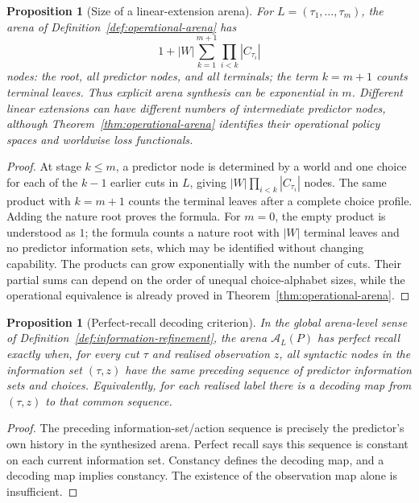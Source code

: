 \documentclass[11pt]{article}
\theoremstyle{plain}
\newtheorem{proposition}[theorem]{Proposition}
\theoremstyle{definition}
\theoremstyle{remark}
\begin{document}
\begin{proposition}[Size of a linear-extension arena]
\label{prop:operational-arena-size}
For $L=(\tau_1,\ldots,\tau_m)$, the arena of
Definition~\ref{def:operational-arena} has
\[
1+|W|\sum_{k=1}^{m+1}\prod_{i<k}|C_{\tau_i}|
\]
nodes: the root, all predictor nodes, and all terminals; the term $k=m+1$ counts
terminal leaves. Thus explicit arena
synthesis can be exponential in $m$. Different linear extensions can have
different numbers of intermediate predictor nodes, although
Theorem~\ref{thm:operational-arena} identifies their operational policy spaces
and worldwise loss functionals.
\end{proposition}

\begin{proof}
At stage $k\le m$, a predictor node is determined by a world and one choice for
each of the $k-1$ earlier cuts in $L$, giving
$|W|\prod_{i<k}|C_{\tau_i}|$ nodes. The same product with $k=m+1$ counts the
terminal leaves after a complete choice profile. Adding the nature root proves
the formula. For $m=0$, the empty product is understood as $1$; the formula
counts a nature root with $|W|$ terminal leaves and no predictor information
sets, which may be identified without changing capability. The products can grow
exponentially with the number of cuts. Their partial sums can depend on the
order of unequal choice-alphabet sizes, while the operational equivalence is
already proved in Theorem~\ref{thm:operational-arena}.
\end{proof}

\begin{proposition}[Perfect-recall decoding criterion]
\label{prop:operational-perfect-recall}
In the global arena-level sense of Definition~\ref{def:information-refinement},
the arena $\mathcal A_L(P)$ has perfect recall exactly when, for every cut
$\tau$ and realised observation $z$, all syntactic nodes in the information set
$(\tau,z)$ have the same preceding sequence of predictor information sets and
choices. Equivalently, for each realised label there is a decoding map from
$(\tau,z)$ to that common sequence.
\end{proposition}

\begin{proof}
The preceding information-set/action sequence is precisely the predictor's own
history in the synthesized arena. Perfect recall says this sequence is constant
on each current information set. Constancy defines the decoding map, and a
decoding map implies constancy. The existence of the observation map alone is
insufficient.
\end{proof}
\end{document}
